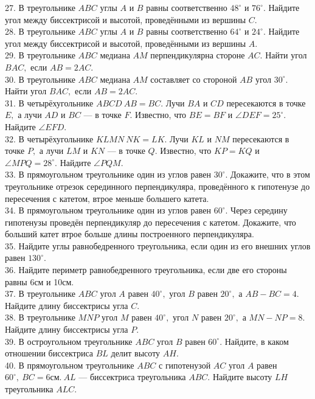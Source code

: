 27. В треугольнике $ABC$ углы $A$ и $B$ равны соответственно $48^\circ$ и $76^\circ.$ Найдите угол между биссектрисой и высотой, проведёнными из вершины $C.$\\
28. В треугольнике $ABC$ углы $A$ и $B$ равны соответственно $64^\circ$ и $24^\circ.$ Найдите угол между биссектрисой и высотой, проведёнными из вершины $A.$\\
29. В треугольнике $ABC$ медиана $AM$ перпендикулярна стороне $AC.$ Найти угол $BAC,$ если $AB=2AC.$\\
30. В треугольнике $ABC$ медиана $AM$ составляет со стороной $AB$ угол $30^\circ.$ Найти угол $BAC,$ если $AB=2AC.$\\
31. В четырёхугольнике $ABCD\ AB=BC.$ Лучи $BA$ и $CD$ пересекаются в точке $E,$ а лучи $AD$ и $BC$ --- в точке $F.$ Известно, что $BE=BF$ и $\angle DEF=25^\circ.$ Найдите $\angle EFD.$\\
32. В четырёхугольнике $KLMN\ NK=LK.$ Лучи $KL$ и $NM$ пересекаются в точке $P,$ а лучи $LM$ и $KN$ --- в точке $Q.$ Известно, что $KP=KQ$ и $\angle MPQ=28^\circ.$ Найдите $\angle PQM.$\\
33. В прямоугольном треугольнике один из углов равен $30^\circ.$ Докажите, что в этом треугольнике отрезок серединного перпендикуляра, проведённого к гипотенузе до пересечения с катетом, втрое меньше большего катета.\\
34. В прямоугольном треугольнике один из углов равен $60^\circ.$ Через середину гипотенузы проведён перпендикуляр до пересечения с катетом. Докажите, что больший катет втрое больше длины построенного перпендикуляра.\\
35. Найдите углы равнобедренного треугольника, если один из его внешних углов равен $130^\circ.$\\
36. Найдите периметр равнобедренного треугольника, если две его стороны равны 6см и 10см.\\
37. В треугольнике $ABC$ угол $A$ равен $40^\circ,$ угол $B$ равен $20^\circ,$ а $AB-BC=4.$  Найдите длину биссектрисы угла $C.$\\
38. В треугольнике $MNP$ угол $M$ равен $40^\circ,$ угол $N$ равен $20^\circ,$ а $MN-NP=8.$  Найдите длину биссектрисы угла $P.$\\
39. В остроугольном треугольнике $ABC$ угол $B$ равен $60^\circ.$ Найдите, в каком отношении биссектриса $BL$ делит высоту $AH.$\\
40. В прямоугольном треугольнике $ABC$ с гипотенузой $AC$ угол $A$ равен $60^\circ,\
BC=6\text{см}.\ AL$ --- биссектриса треугольника $ABC.$ Найдите высоту $LH$ треугольника $ALC.$\\
